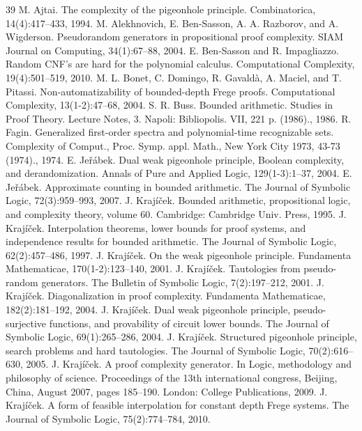 \documentclass[10pt,a4paper]{article}
\begin{document}
\begin{thebibliography}{39}
 M. Ajtai. The complexity of the pigeonhole principle. Combinatorica, 14(4):417–433, 1994.
 M. Alekhnovich, E. Ben-Sasson, A. A. Razborov, and A. Wigderson. Pseudorandom generators in propositional proof complexity. SIAM Journal on Computing, 34(1):67–88, 2004.
 E. Ben-Sasson and R. Impagliazzo. Random CNF’s are hard for the polynomial calculus. Computational Complexity, 19(4):501–519, 2010.
 M. L. Bonet, C. Domingo, R. Gavaldà, A. Maciel, and T. Pitassi. Non-automatizability of bounded-depth Frege proofs. Computational Complexity, 13(1-2):47–68, 2004.
 S. R. Buss. Bounded arithmetic. Studies in Proof Theory. Lecture Notes, 3. Napoli: Bibliopolis. VII, 221 p. (1986)., 1986.
 R. Fagin. Generalized first-order spectra and polynomial-time recognizable sets. Complexity of Comput., Proc. Symp. appl. Math., New York City 1973, 43-73 (1974)., 1974.
 E. Jeřábek. Dual weak pigeonhole principle, Boolean complexity, and derandomization. Annals of Pure and Applied Logic, 129(1-3):1–37, 2004.
 E. Jeřábek. Approximate counting in bounded arithmetic. The Journal of Symbolic Logic, 72(3):959–993, 2007.
 J. Krajíček. Bounded arithmetic, propositional logic, and complexity theory, volume 60. Cambridge: Cambridge Univ. Press, 1995.
 J. Krajíček. Interpolation theorems, lower bounds for proof systems, and independence results for bounded arithmetic. The Journal of Symbolic Logic, 62(2):457–486, 1997.
 J. Krajíček. On the weak pigeonhole principle. Fundamenta Mathematicae, 170(1-2):123–140, 2001.
 J. Krajíček. Tautologies from pseudo-random generators. The Bulletin of Symbolic Logic, 7(2):197–212, 2001.
 J. Krajíček. Diagonalization in proof complexity. Fundamenta Mathematicae, 182(2):181–192, 2004.
 J. Krajíček. Dual weak pigeonhole principle, pseudo-surjective functions, and provability of circuit lower bounds. The Journal of Symbolic Logic, 69(1):265–286, 2004.
 J. Krajíček. Structured pigeonhole principle, search problems and hard tautologies. The Journal of Symbolic Logic, 70(2):616–630, 2005.
 J. Krajíček. A proof complexity generator. In Logic, methodology and philosophy of science. Proceedings of the 13th international congress, Beijing, China, August 2007, pages 185–190. London: College Publications, 2009.
 J. Krajíček. A form of feasible interpolation for constant depth Frege systems. The Journal of Symbolic Logic, 75(2):774–784, 2010.

\end{thebibliography}
\end{document}
